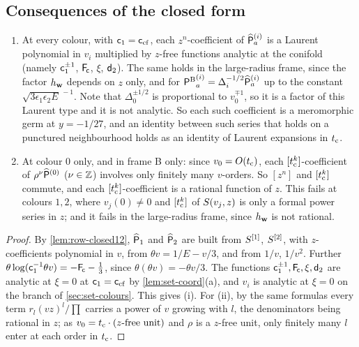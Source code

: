 \subsection{Consequences of the closed form}
\label{sec:row-conseq}

\begin{cor}
\label{cor:row-carry}
\begin{enumerate}
\item At every colour, with $\mathsf{c}_{1}=\mathsf{c}_{\mathrm{cf}}$, each $z^n$-coefficient of $\widehat{\mathsf{P}}_a^{(i)}$ is a Laurent polynomial in $v_i$ multiplied by $z$-free functions analytic at the conifold (namely $\mathsf{c}_{1}^{\pm1}$, $\mathsf{F}_{\!\mathsf{c}}$, $\xi$, $\mathsf{d}_{2}$). The same holds in the large-radius frame, since the factor $h_{\mathbf{w}}$ depends on $z$ only, and for ${\mathsf{P}^{\mathrm{B}}}_a^{(i)}=\Delta_i^{-1/2}\widehat{\mathsf{P}}_a^{(i)}$ up to the constant $\sqrt{3\epsilon_1\epsilon_2E}^{\,-1}$. Note that $\Delta_0^{\pm1/2}$ is proportional to $v_0^{\mp1}$, so it is a factor of this Laurent type and it is not analytic. So each such coefficient is a meromorphic germ at $y=-1/27$, and an identity between such series that holds on a punctured neighbourhood holds as an identity of Laurent expansions in $t_{\mathrm{c}}$.
\item At colour $0$ only, and in frame B only: since $v_0=O(t_{\mathrm{c}})$, each $[t_{\mathrm{c}}^k]$-coefficient of $\rho^{\nu}\widehat{\mathsf{P}}^{(0)}$ ($\nu\in\mathbb{Z}$) involves only finitely many $v$-orders. So $[z^n]$ and $[t_{\mathrm{c}}^k]$ commute, and each $[t_{\mathrm{c}}^k]$-coefficient is a rational function of $z$. This fails at colours $1,2$, where $v_j(0)\neq0$ and $[t_{\mathrm{c}}^k]$ of $S(v_j,z)$ is only a formal power series in $z$; and it fails in the large-radius frame, since $h_{\mathbf{w}}$ is not rational.
\end{enumerate}
\end{cor}

\begin{proof}
By \cref{lem:row-closed12}, $\widehat{\mathsf{P}}_1$ and $\widehat{\mathsf{P}}_2$ are built from $S^{[1]}$, $S^{[2]}$, with $z$-coefficients polynomial in $v$, from $\theta v=1/E-v/3$, and from $1/v$, $1/v^2$. Further $\theta\log(\mathsf{c}_{1}^{-1}\theta v)=-\mathsf{F}_{\!\mathsf{c}}-\frac13$, since $\theta(\theta v)=-\theta v/3$. The functions $\mathsf{c}_{1}^{\pm1},\mathsf{F}_{\!\mathsf{c}},\xi,\mathsf{d}_{2}$ are analytic at $\xi=0$ at $\mathsf{c}_{1}=\mathsf{c}_{\mathrm{cf}}$ by \cref{lem:set-coord}(a), and $v_i$ is analytic at $\xi=0$ on the branch of \cref{sec:set-colours}. This gives (i). For (ii), by the same formulas every term $r_l(vz)^l/\prod$ carries a power of $v$ growing with $l$, the denominators being rational in $z$; as $v_0=t_{\mathrm{c}}\cdot(\text{$z$-free unit})$ and $\rho$ is a $z$-free unit, only finitely many $l$ enter at each order in $t_{\mathrm{c}}$.
\end{proof}

